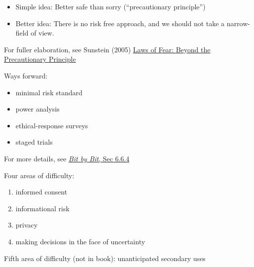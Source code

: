 \documentclass{beamer}
\def\vf{\vfill}
\begin{document}
\begin{frame}

\begin{itemize}
\item Simple idea: Better safe than sorry (``precautionary principle'')
\pause
\item Better idea: There is no risk free approach, and we should not take a narrow-field of view.
\end{itemize}

\vf
For fuller elaboration, see Sunstein (2005) \href{https://www.amazon.com/Laws-Fear-Precautionary-Principle-Lectures/dp/0521615127}{Laws of Fear: Beyond the Precautionary Principle}
\end{frame}
\begin{frame}

Ways forward:\\
\begin{itemize}
\pause
\item minimal risk standard
\pause
\item power analysis
\pause
\item ethical-response surveys
\pause
\item staged trials
\end{itemize}

For more details, see \href{https://www.bitbybitbook.com/en/1st-ed/ethics/dilemmas/uncertainty/}{\textit{Bit by Bit}, Sec 6.6.4}
\end{frame}
\begin{frame}

Four areas of difficulty:
\begin{enumerate}
\item informed consent
\item informational risk
\item privacy
\item making decisions in the face of uncertainty
\end{enumerate}

\end{frame}
\begin{frame}

Fifth area of difficulty (not in book): \pause unanticipated secondary uses

\end{frame}
\end{document}
